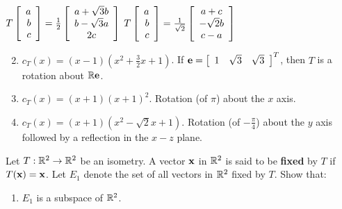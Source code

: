 \begin{multicols}{2}
\begin{ex}
\begin{exenumerate}
\exitem* $T
\left[ \begin{array}{r}
a \\
b \\
c
\end{array} \right]
= \tfrac{1}{2}
\left[ \begin{array}{c}
a + \sqrt{3} b \\
b - \sqrt{3} a \\
2c
\end{array} \right]$
\exitem* $T
\left[ \begin{array}{r}
a \\
b \\
c
\end{array} \right]
= \tfrac{1}{\sqrt{2}}
\left[ \begin{array}{c}
a + c \\
-\sqrt{2} b \\
c - a
\end{array} \right]$
\end{exenumerate}
\begin{sol}
\begin{enumerate}[label={\alph*.}]
	\setcounter{enumi}{1}
\item $ c_T(x) = (x - 1)(x^2 + \frac{3}{2}x + 1)$. If $ \textbf{e} = 
\left[ \begin{array}{ccc}
1 & \sqrt{3} & \sqrt{3}
\end{array} \right]^T$, then $T$ is a rotation about $\mathbb{R}\textbf{e}$.

\setcounter{enumi}{3}
\item $c_{T}(x) = (x + 1)(x + 1)^{2}$. Rotation (of $\pi$) about the $x$ axis.

\setcounter{enumi}{5}
\item $ c_T(x) = (x + 1)(x^2 - \sqrt{2}x + 1) $. Rotation (of $-\frac{\pi}{4}$) about the $y$ axis followed by a reflection in the $x-z$ plane.
\end{enumerate}
\end{sol}
\end{ex}

\begin{ex} \label{ex:10_4_4}
Let $T : \mathbb{R}^2 \to \mathbb{R}^2$ be an isometry. A vector $\textbf{x}$ in $\mathbb{R}^2$ is said to be \textbf{fixed} by $T$ if $T(\textbf{x}) = \textbf{x}$. Let $E_{1}$ denote the set of all vectors in $\mathbb{R}^2$ fixed by $T$. Show that:

\begin{enumerate}[label={\alph*.}]
\item $E_{1}$ is a subspace of $\mathbb{R}^2$.


\end{enumerate}
\end{ex}
\end{multicols}
